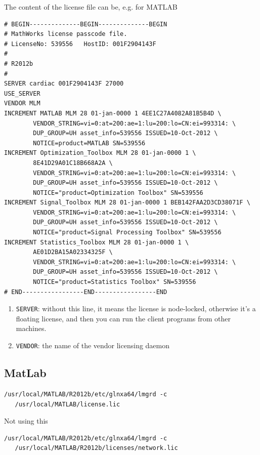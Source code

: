The content of the license file can be, e.g. for MATLAB
\begin{verbatim}
# BEGIN--------------BEGIN--------------BEGIN                                                                                                    
# MathWorks license passcode file.
# LicenseNo: 539556   HostID: 001F2904143F
#
# R2012b
#
SERVER cardiac 001F2904143F 27000
USE_SERVER
VENDOR MLM
INCREMENT MATLAB MLM 28 01-jan-0000 1 4EE1C27A4082A81B5B4D \
        VENDOR_STRING=vi=0:at=200:ae=1:lu=200:lo=CN:ei=993314: \
        DUP_GROUP=UH asset_info=539556 ISSUED=10-Oct-2012 \
        NOTICE=product=MATLAB SN=539556
INCREMENT Optimization_Toolbox MLM 28 01-jan-0000 1 \
        8E41D29A01C18B668A2A \
        VENDOR_STRING=vi=0:at=200:ae=1:lu=200:lo=CN:ei=993314: \
        DUP_GROUP=UH asset_info=539556 ISSUED=10-Oct-2012 \
        NOTICE="product=Optimization Toolbox" SN=539556
INCREMENT Signal_Toolbox MLM 28 01-jan-0000 1 BEB142FAA2D3CD38071F \
        VENDOR_STRING=vi=0:at=200:ae=1:lu=200:lo=CN:ei=993314: \
        DUP_GROUP=UH asset_info=539556 ISSUED=10-Oct-2012 \
        NOTICE="product=Signal Processing Toolbox" SN=539556
INCREMENT Statistics_Toolbox MLM 28 01-jan-0000 1 \
        AE01D2BA15A02334325F \
        VENDOR_STRING=vi=0:at=200:ae=1:lu=200:lo=CN:ei=993314: \
        DUP_GROUP=UH asset_info=539556 ISSUED=10-Oct-2012 \
        NOTICE="product=Statistics Toolbox" SN=539556
# END-----------------END-----------------END
\end{verbatim}

\begin{enumerate}
  \item \verb!SERVER!: without this line, it means the license is node-locked,
  otherwise it's a floating license, and then you can run the client programs
  from other machines.
  \item \verb!VENDOR!: the name of the vendor licensing daemon 
\end{enumerate}



\subsection{MatLab}

\begin{verbatim}
/usr/local/MATLAB/R2012b/etc/glnxa64/lmgrd -c 
   /usr/local/MATLAB/license.lic
\end{verbatim}
Not using this
\begin{verbatim}
/usr/local/MATLAB/R2012b/etc/glnxa64/lmgrd -c 
   /usr/local/MATLAB/R2012b/licenses/network.lic
\end{verbatim}


